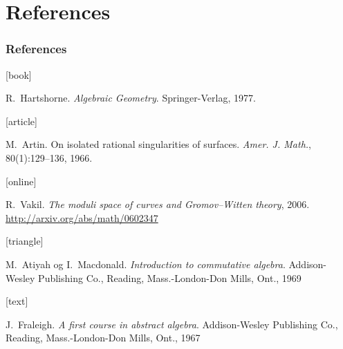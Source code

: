 \documentclass[UKenglish]{beamer}
\begin{document}
\section{References}

\begin{frame}[allowframebreaks]
    \frametitle{References}

    \begin{thebibliography}{}

        [book]

        R.~Hartshorne.
        \newblock \emph{Algebraic Geometry}.
        \newblock Springer-Verlag, 1977.

        [article]

        M.~Artin.
        \newblock On isolated rational singularities of surfaces.
        \newblock \emph{Amer. J. Math.}, 80(1):129--136, 1966.

        [online]

        R.~Vakil.
        \newblock \emph{The moduli space of curves and Gromov--Witten theory}, 2006.
        \newblock \url{http://arxiv.org/abs/math/0602347}

        [triangle]

        M.~Atiyah og I.~Macdonald.
        \newblock \emph{Introduction to commutative algebra}.
        \newblock Addison-Wesley Publishing Co., Reading, Mass.-London-Don
        Mills, Ont., 1969

        [text]

        J.~Fraleigh.
        \newblock \emph{A first course in abstract algebra}.
        \newblock Addison-Wesley Publishing Co., Reading, Mass.-London-Don Mills, Ont., 1967

    \end{thebibliography}
\end{frame}
\end{document}
